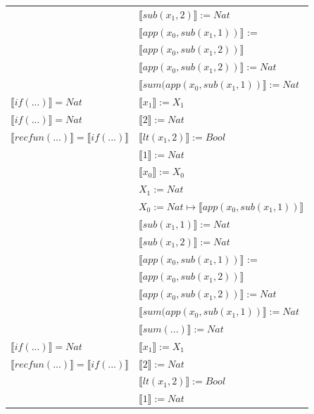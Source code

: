 \begin{exercise}
\begin{description}
\begin{center}
\begin{longtable}{ | l | l | }
			     & $ \llbracket sub(x_1,2) \rrbracket := Nat$ \\
			     & $ \llbracket app(x_0, sub(x_1,1)) \rrbracket$ := \\
			     & $ \llbracket app(x_0, sub(x_1,2)) \rrbracket$\\ 
			     & $ \llbracket app(x_0, sub(x_1,2)) \rrbracket := Nat$ \\
			     & $ \llbracket sum(app(x_0, sub(x_1,1)) \rrbracket := Nat$ \\
                    \hline 
                        $ \llbracket if(...) \rrbracket = Nat$ & $ \llbracket x_1 \rrbracket := X_1$\\
                        $ \llbracket if(...) \rrbracket = Nat$ & $ \llbracket 2 \rrbracket := Nat$\\
                        $ \llbracket recfun(...) \rrbracket =  \llbracket if(...) \rrbracket$ & $ \llbracket lt(x_1 , 2) \rrbracket := Bool$\\
                        & $ \llbracket 1 \rrbracket := Nat$\\ 
                        & $ \llbracket x_0 \rrbracket := X_0$\\  
			     & $X_1 := Nat$\\
			     & $X_0 := Nat \mapsto  \llbracket app(x_0, sub(x_1,1)) \rrbracket$\\
			     & $ \llbracket sub(x_1,1) \rrbracket := Nat$\\
			     & $ \llbracket sub(x_1,2) \rrbracket := Nat$ \\
			     & $ \llbracket app(x_0, sub(x_1,1)) \rrbracket$ := \\
			     & $ \llbracket app(x_0, sub(x_1,2)) \rrbracket$\\ 
			     & $ \llbracket app(x_0, sub(x_1,2)) \rrbracket := Nat$ \\
			     & $ \llbracket sum(app(x_0, sub(x_1,1)) \rrbracket := Nat$ \\
			     & $ \llbracket sum(...) \rrbracket := Nat$ \\
                     \hline 
                        $ \llbracket if(...) \rrbracket = Nat$ & $ \llbracket x_1 \rrbracket := X_1$\\
                        $ \llbracket recfun(...) \rrbracket =  \llbracket if(...) \rrbracket$ & $ \llbracket 2 \rrbracket := Nat$\\ 
                        & $ \llbracket lt(x_1 , 2) \rrbracket := Bool$\\ 
                        & $ \llbracket 1 \rrbracket := Nat$\\  

\end{longtable}
\end{center}
\end{description}
\end{exercise}
